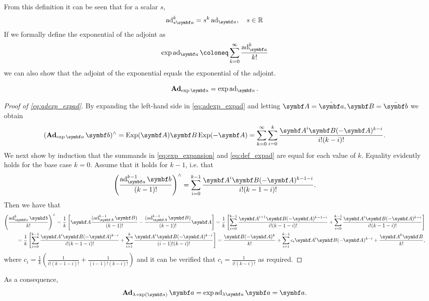 From this definition it can be seen that for a scalar $s$,
\begin{equation}
  \label{eq:ad_scaling}
  \ad_{s \a}^k = s^k \ad_\a, \quad s \in \mathbb{R}
\end{equation}
If we formally define the exponential of the adjoint as
\begin{equation}
  \label{eq:def_expad}
  \exp \ad_\a \coloneq \sum_{k=0}^\infty \frac{\ad^k_\a}{k!}
\end{equation}
we can also show that the adjoint of the exponential equals the exponential of the adjoint.
\begin{properties}
  \begin{equation}
    \label{eq:adexp_expad}
    \bAd_{\exp \a} = \exp \ad_\a.
  \end{equation}
\end{properties}
\begin{proof}[Proof of \eqref{eq:adexp_expad}]
  By expanding the left-hand side in \eqref{eq:adexp_expad} and letting $\A = \hat \a, \B = \hat \b$ we obtain
  \begin{equation}
    \label{eq:exp_expansion}
    (\bAd_{\exp \a} \b)^\wedge = \Exp (\A) \B \Exp (-\A) = \sum_{k=0}^\infty \sum_{i = 0}^{k} \frac{\A^i \B (-\A)^{k-i}}{i! (k - i)!}.
  \end{equation}
  We next show by induction that the summands in \eqref{eq:exp_expansion} and \eqref{eq:def_expad} are equal for each value of $k$. Equality evidently holds for the base case $k=0$. Assume that it holds for $k-1$, i.e. that
  \begin{equation}
    \left( \frac{\ad_{\a}^{k-1} \b}{(k-1)!} \right)^\wedge = \sum_{i=0}^{k-1} \frac{\A^i \B (-\A)^{k-1-i}}{i! (k-1-i)!}.
  \end{equation}
  Then we have that
  \begin{equation*}
    \begin{aligned}
      \left( \frac{\ad_\a^{k} \b}{k!} \right)^\wedge = \frac{1}{k} \left[ \A \frac{(\ad_\A^{k-1} \B)}{(k-1)!} - \frac{(\ad_\A^{k-1} \B)}{(k-1)!} \A \right] =
      \frac{1}{k} \left[ \sum_{i=0}^{k-1} \frac{\A^{i+1} \B (-\A)^{k-1-i}}{i! (k-1-i)!} + \sum_{i=0}^{k-1} \frac{\A^i \B (-\A)^{k-i}}{i! (k-1-i)!} \right] \\
      = \frac{1}{k} \left[ \sum_{i=0}^{k-1} \frac{\A^i \B (-\A)^{k-i}}{i! (k-1-i)!} +  \sum_{i=1}^{k} \frac{\A^{i} \B (-\A)^{k-i}}{(i-1)! (k-i)!} \right] = \frac{\B (-\A)^k}{k!} + \sum_{i=1}^{k-1} c_i \A^i \B (-\A)^{k-i} + \frac{\A^k \B}{k!},
    \end{aligned}
  \end{equation*}
  where $c_i = \frac{1}{k} \left( \frac{1}{i!(k-1-i)!} + \frac{1}{(i-1)!(k-i)!} \right)$ and it can be verified that $c_i = \frac{1}{i!(k-i)!}$ as required.
\end{proof}
As a consequence,
\begin{equation}
  \label{eq:ad_exp_a_a}
  \bAd_{\lambda \exp(\a)} \a = \exp \ad_{\lambda \a} \a = \a. 
\end{equation}

